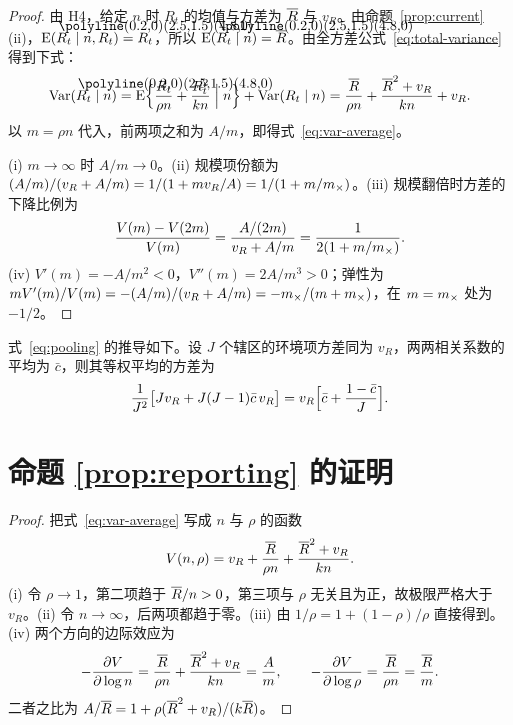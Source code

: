 \begin{proof}
由 H4，给定 $n$ 时 $R_t$ 的均值与方差为 $\overline{R}$ 与 $v_R$。由命题~\ref{prop:current}(ii)，$\E(\widehat R_t\mid n,R_t)=R_t$，所以 $\E(\widehat R_t\mid n)=\Rbar$。由全方差公式~\eqref{eq:total-variance} 得到下式：
\begin{equation*}
  \Var(\widehat R_t\mid n)=\E\Bigl\{\frac{R_t}{\rho n}+\frac{R_t^2}{kn}\Bigm| n\Bigr\}+\Var(R_t\mid n)
  =\frac{\Rbar}{\rho n}+\frac{\Rbar^2+v_R}{kn}+v_R.
\end{equation*}
以 $m=\rho n$ 代入，前两项之和为 $A/m$，即得式~\eqref{eq:var-average}。

(i) $m\to\infty$ 时 $A/m\to0$。(ii) 规模项份额为 $(A/m)/(v_R+A/m)=1/(1+mv_R/A)=1/(1+m/m_{\times})$。(iii) 规模翻倍时方差的下降比例为
\begin{equation*}
  \frac{V(m)-V(2m)}{V(m)}=\frac{A/(2m)}{v_R+A/m}=\frac{1}{2(1+m/m_{\times})}.
\end{equation*}
(iv) $V'(m)=-A/m^2<0$，$V''(m)=2A/m^3>0$；弹性为 $mV'(m)/V(m)=-(A/m)/(v_R+A/m)=-m_{\times}/(m+m_{\times})$，在 $m=m_{\times}$ 处为 $-1/2$。
\end{proof}

式~\eqref{eq:pooling} 的推导如下。设 $J$ 个辖区的环境项方差同为 $v_R$，两两相关系数的平均为 $\bar c$，则其等权平均的方差为
\begin{equation*}
  \frac{1}{J^2}\bigl[Jv_R+J(J-1)\bar c\,v_R\bigr]=v_R\Bigl[\bar c+\frac{1-\bar c}{J}\Bigr].
\end{equation*}

\section{\texorpdfstring{命题 \ref{prop:reporting} 的证明}{命题 3.3 的证明}}
\label{app:reporting}

\begin{proof}
把式~\eqref{eq:var-average} 写成 $n$ 与 $\rho$ 的函数
\begin{equation*}
  V(n,\rho)=v_R+\frac{\overline{R}}{\rho n}+\frac{\overline{R}^2+v_R}{kn}.
\end{equation*}
(i) 令 $\rho\to1$，第二项趋于 $\overline{R}/n>0$，第三项与 $\rho$ 无关且为正，故极限严格大于 $v_R$。(ii) 令 $n\to\infty$，后两项都趋于零。(iii) 由 $1/\rho=1+(1-\rho)/\rho$ 直接得到。(iv) 两个方向的边际效应为
\begin{equation*}
  -\frac{\partial V}{\partial\log n}=\frac{\overline{R}}{\rho n}+\frac{\overline{R}^2+v_R}{kn}=\frac{A}{m},\qquad
  -\frac{\partial V}{\partial\log\rho}=\frac{\overline{R}}{\rho n}=\frac{\overline{R}}{m}.
\end{equation*}
二者之比为 $A/\overline{R}=1+\rho(\overline{R}^2+v_R)/(k\overline{R})$。
\end{proof}

